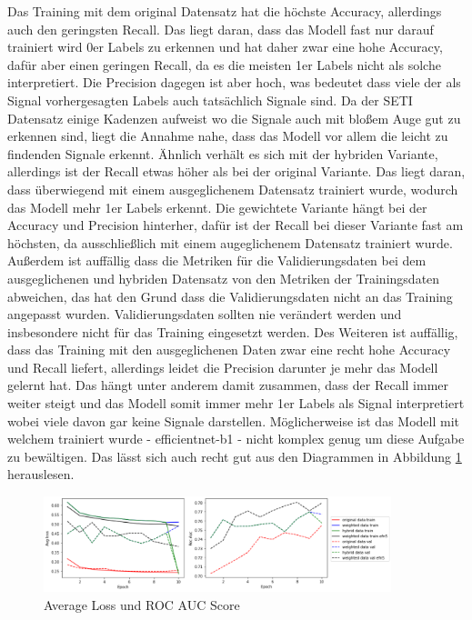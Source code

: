 \documentclass[12pt, a4paper]{article}
\begin{document}
Das Training mit dem original Datensatz hat die höchste Accuracy, allerdings auch den geringsten Recall. Das liegt daran, dass das Modell fast nur darauf trainiert wird 0er Labels zu erkennen und hat daher zwar eine hohe Accuracy, dafür aber einen geringen Recall, da es die meisten 1er Labels nicht als solche interpretiert. Die Precision dagegen ist aber hoch, was bedeutet dass viele der als Signal vorhergesagten Labels auch tatsächlich Signale sind. Da der SETI Datensatz einige Kadenzen aufweist wo die Signale auch mit bloßem Auge gut zu erkennen sind, liegt die Annahme nahe, dass das Modell vor allem die leicht zu findenden Signale erkennt. Ähnlich verhält es sich mit der hybriden Variante, allerdings ist der Recall etwas höher als bei der original Variante. Das liegt daran, dass überwiegend mit einem ausgeglichenem Datensatz trainiert wurde, wodurch das Modell mehr 1er Labels erkennt. Die gewichtete Variante hängt bei der Accuracy und Precision hinterher, dafür ist der Recall bei dieser Variante fast am höchsten, da ausschließlich mit einem augeglichenem Datensatz trainiert wurde. Außerdem ist auffällig dass die Metriken für die Validierungsdaten bei dem ausgeglichenen und hybriden Datensatz von den Metriken der Trainingsdaten abweichen, das hat den Grund dass die Validierungsdaten nicht an das Training angepasst wurden. Validierungsdaten sollten nie verändert werden und insbesondere nicht für das Training eingesetzt werden. Des Weiteren ist auffällig, dass das Training mit den ausgeglichenen Daten zwar eine recht hohe Accuracy und Recall liefert, allerdings leidet die Precision darunter je mehr das Modell gelernt hat. Das hängt unter anderem damit zusammen, dass der Recall immer weiter steigt und das Modell somit immer mehr 1er Labels als Signal interpretiert wobei viele davon gar keine Signale darstellen. Möglicherweise ist das Modell mit welchem trainiert wurde - efficientnet-b1 - nicht komplex genug um diese Aufgabe zu bewältigen. Das lässt sich auch recht gut aus den Diagrammen in Abbildung \ref{fig:avlras} herauslesen.

\begin{figure}[t]
\centering
\includegraphics[width=0.9\textwidth]{metrics-avgloss-rocauc.png}
\caption{Average Loss und ROC AUC Score}
\label{fig:avlras}
\end{figure}
\end{document}
